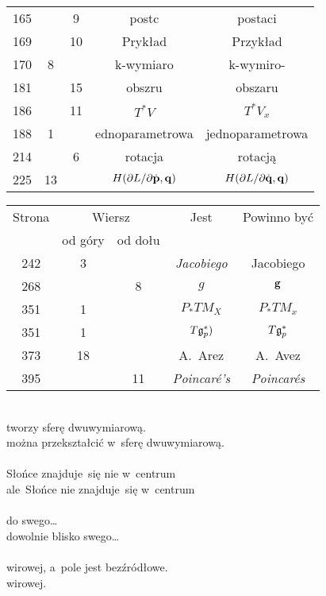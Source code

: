 \documentclass[a4paper,11pt]{article}
\numberwithin{equation}{section}
\begin{document}
\begin{center}
\begin{tabular}{|c|c|c|c|c|}
    165 & &  9 & postc & postaci \\
    169 & & 10 & Prykład & Przykład \\
    170 & 8 & & k-wymiaro & k-wymiro- \\
    181 & & 15 & obszru & obszaru \\
    186 & & 11 & $T^{ * } V$ & $T^{ * } V_{ x }$ \\
    188 & 1 & & ednoparametrowa & jednoparametrowa \\
    214 & & 6 & rotacja & rotacją \\
    225 & 13 & & $H( \partial L / \partial \dot{ \mathbf{p} }, \mathbf{q} )$
           & $H( \partial L / \partial \dot{ \mathbf{q} }, \mathbf{q} )$ \\
    \hline
  \end{tabular}





  \newpage

  \begin{tabular}{|c|c|c|c|c|}
    \hline
    Strona & \multicolumn{2}{c|}{Wiersz} & Jest
                              & Powinno być \\ \cline{2-3}
    & od góry & od dołu & & \\
    \hline
    242 &  3 & & \textit{Jacobiego} & Jacobiego \\
    268 & &  8 & $g$ & $\mathbf{g}$ \\
    351 &  1 & & $P_{ * }TM_{ X }$ & $P_{ * }TM_{ x }$ \\
    351 &  1 & & $T\mathfrak{g}_{ p }^{ * })$ & $T\mathfrak{g}_{ p }^{ * }$ \\
    373 & 18 & & A.~Arez & A.~Avez \\
    395 & & 11 & \textit{Poincar\'{e}'s} & \textit{Poincar\'{e}s} \\
    \hline
  \end{tabular}

\end{center}

\VerSpaceTwo



\noindent
{} \\
\Jest tworzy sferę dwuwymiarową. \\
\PowinnoByc można przekształcić w~sferę dwuwymiarową. \\
 \\
\Jest  Słońce znajduje~się nie w~centrum \\
\PowinnoByc ale~Słońce nie znajduje~się w~centrum \\
 \\
\Jest do swego\ldots \\
\PowinnoByc dowolnie blisko swego\ldots \\
 \\
\Jest wirowej, a~pole jest bezźródłowe. \\
\PowinnoByc wirowej. \\
\end{document}
